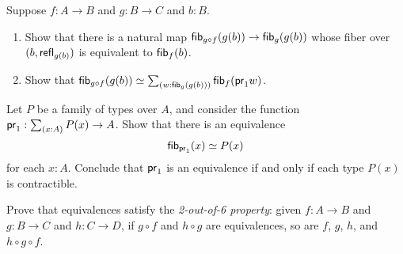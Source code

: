 \begin{ex}\label{ex:unstable-octahedron}
  Suppose $f:A\to B$ and $g:B\to C$ and $b:B$.
  \begin{enumerate}
  \item Show that there is a natural map ${\mathsf{fib}}_{g\circ f}(g(b)) \to {\mathsf{fib}}_{g}(g(b))$ whose fiber over $(b,\mathsf{refl}_{g(b)})$ is equivalent to ${\mathsf{fib}}_{f}(b)$.
  \item Show that $\eqv{\hfib{g\circ f}{g(b)}}{\sm{w:\hfib{g}{g(b)}} \hfib f {\proj1 w}}$.
  \end{enumerate}
\end{ex}

\begin{ex}\label{ex:projoftotaloffamcontrisequiv}
  Let $P$ be a family of types over $A$, and consider the function
  $\proj{1}:\sm{x:A}P(x)\to A$. Show that there is an equivalence
  \begin{equation*}
    {\mathsf{fib}}_{\mathsf{pr}_{1}}(x) \simeq P(x)
  \end{equation*}
  for each $x:A$.
  Conclude that $\mathsf{pr}_{1}$ is an equivalence if and only if each type $P(x)$ is contractible.
\end{ex}

\begin{ex}
  Prove that equivalences satisfy the \emph{2-out-of-6 property}: given $f:A\to B$ and $g:B\to C$ and $h:C\to D$, if $g\circ f$ and $h\circ g$ are equivalences, so are $f$, $g$, $h$, and $h\circ g\circ f$.
\end{ex}

